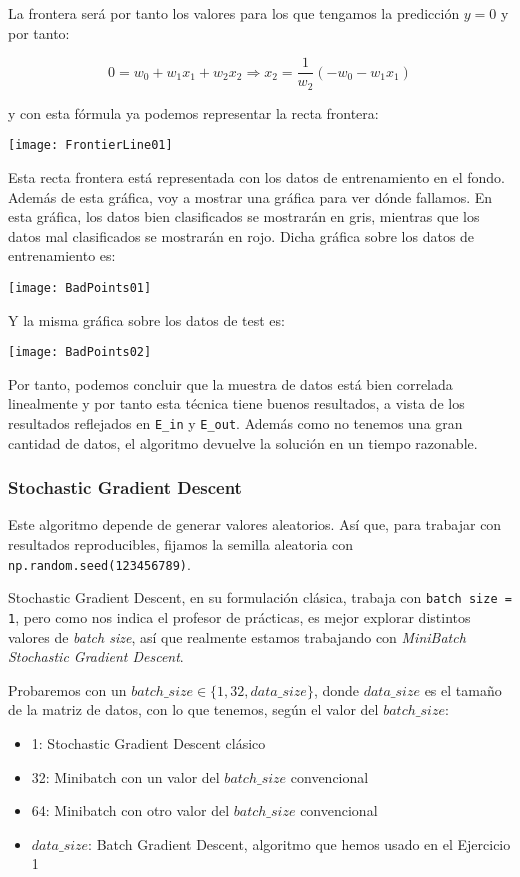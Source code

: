 \documentclass[11pt]{article}
\begin{document}
La frontera será por tanto los valores para los que tengamos la predicción $y = 0$ y por tanto:

\begin{displaymath}
    0 = w_0 + w_1 x_1 + w_2 x_2 \Longrightarrow x_2 = \frac{1}{w_2} (-w_0 - w_1 x_1)
\end{displaymath}

y con esta fórmula ya podemos representar la recta frontera:

\texttt{[image: FrontierLine01]}

Esta recta frontera está representada con los datos de entrenamiento en el fondo. Además de esta gráfica, voy a mostrar una gráfica para ver dónde fallamos. En esta gráfica, los datos bien clasificados se mostrarán en gris, mientras que los datos mal clasificados se mostrarán en rojo. Dicha gráfica sobre los datos de entrenamiento es:

\texttt{[image: BadPoints01]}

Y la misma gráfica sobre los datos de test es:

\texttt{[image: BadPoints02]}

Por tanto, podemos concluir que la muestra de datos está bien correlada linealmente y por tanto esta técnica tiene buenos resultados, a vista de los resultados reflejados en \lstinline{E_in} y \lstinline{E_out}. Además como no tenemos una gran cantidad de datos, el algoritmo devuelve la solución en un tiempo razonable.

\subsubsection{Stochastic Gradient Descent}

Este algoritmo depende de generar valores aleatorios. Así que, para trabajar con resultados reproducibles, fijamos la semilla aleatoria con \lstinline{np.random.seed(123456789)}.

Stochastic Gradient Descent, en su formulación clásica, trabaja con \lstinline{batch size = 1}, pero como nos indica el profesor de prácticas, es mejor explorar distintos valores de \emph{batch size}, así que realmente estamos trabajando con \emph{MiniBatch Stochastic Gradient Descent}.

Probaremos con un $batch\_size \in \{1, 32, data\_size\}$, donde $data\_size$ es el tamaño de la matriz de datos, con lo que tenemos, según el valor del $batch\_size$:

\begin{itemize}
    \item 1: Stochastic Gradient Descent clásico
    \item 32: Minibatch con un valor del $batch\_size$ convencional
    \item 64: Minibatch con otro valor del $batch\_size$ convencional
    \item $data\_size$: Batch Gradient Descent, algoritmo que hemos usado en el Ejercicio 1
\end{itemize}
\end{document}
